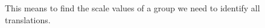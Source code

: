 \documentclass[preview]{standalone}
\begin{document}
This means to find the scale values of a group we need to identify all translations.\ \\
\end{document}
